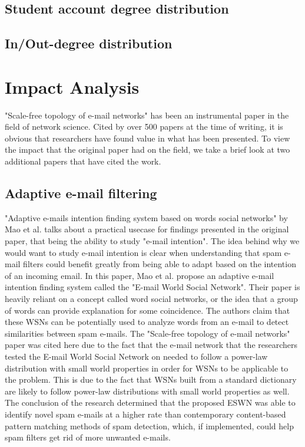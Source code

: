 \documentclass[a4paper]{article}
\begin{document}
\begin{multicols}{2}
\subsection{Student account degree distribution}
\hspace*{\parindent}

\subsection{In/Out-degree distribution}
\hspace*{\parindent}


\section{Impact Analysis}
\hspace*{\parindent}"Scale-free topology of e-mail networks" has been an instrumental paper in the field of network science. Cited by over 500 papers at the time of writing, it is obvious that researchers have found value in what has been presented. To view the impact that the original paper had on the field, we take a brief look at two additional papers that have cited the work.

\subsection{Adaptive e-mail filtering}
\hspace*{\parindent}"Adaptive e-mails intention finding system based on words social networks" by Mao et al. \cite{4} talks about a practical usecase for findings presented in the original paper, that being the ability to study "e-mail intention". The idea behind why we would want to study e-mail intention is clear when understanding that spam e-mail filters could benefit greatly from being able to adapt based on the intention of an incoming email. In this paper, Mao et al. propose an adaptive e-mail intention finding system called the "E-mail World Social Network". Their paper is heavily reliant on a concept called word social networks, or the idea that a group of words can provide explanation for some coincidence. The authors claim that these WSNs can be potentially used to analyze words from an e-mail to detect similarities between spam e-mails. The "Scale-free topology of e-mail networks" paper was cited here due to the fact that the e-mail network that the researchers tested the E-mail World Social Network on needed to follow a power-law distribution with small world properties in order for WSNs to be applicable to the problem. This is due to the fact that WSNs built from a standard dictionary are likely to follow power-law distributions with small world properties as well. The conclusion of the research determined that the proposed ESWN was able to identify novel spam e-mails at a higher rate than contemporary content-based pattern matching methods of spam detection, which, if implemented, could help spam filters get rid of more unwanted e-mails.


\end{multicols}
\end{document}

